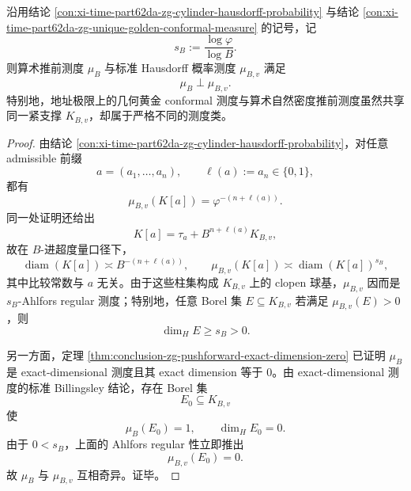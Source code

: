 \begin{theorem}\label{thm:conclusion-zg-arithmetic-golden-measure-class-splitting}
沿用结论 \ref{con:xi-time-part62da-zg-cylinder-hausdorff-probability} 与结论 \ref{con:xi-time-part62da-zg-unique-golden-conformal-measure} 的记号，记
\[
s_B:=\frac{\log\varphi}{\log B}.
\]
则算术推前测度 \(\mu_B\) 与标准 Hausdorff 概率测度 \(\mu_{B,v}\) 满足
\[
\mu_B\perp \mu_{B,v}.
\]
特别地，地址极限上的几何黄金 conformal 测度与算术自然密度推前测度虽然共享同一紧支撑 \(K_{B,v}\)，却属于严格不同的测度类。
\end{theorem}
\begin{proof}
由结论 \ref{con:xi-time-part62da-zg-cylinder-hausdorff-probability}，对任意 admissible 前缀
\[
a=(a_1,\dots,a_n),
\qquad
\ell(a):=a_n\in\{0,1\},
\]
都有
\[
\mu_{B,v}(K[a])=\varphi^{-(n+\ell(a))}.
\]
同一处证明还给出
\[
K[a]=\tau_a+B^{n+\ell(a)}K_{B,v},
\]
故在 \(B\)-进超度量口径下，
\[
\operatorname{diam}(K[a])\asymp B^{-(n+\ell(a))},
\qquad
\mu_{B,v}(K[a])\asymp \operatorname{diam}(K[a])^{s_B},
\]
其中比较常数与 \(a\) 无关。由于这些柱集构成 \(K_{B,v}\) 上的 clopen 球基，\(\mu_{B,v}\) 因而是 \(s_B\)-Ahlfors regular 测度；特别地，任意 Borel 集 \(E\subseteq K_{B,v}\) 若满足 \(\mu_{B,v}(E)>0\)，则
\[
\dim_H E\ge s_B>0.
\]

另一方面，定理 \ref{thm:conclusion-zg-pushforward-exact-dimension-zero} 已证明 \(\mu_B\) 是 exact-dimensional 测度且其 exact dimension 等于 \(0\)。由 exact-dimensional 测度的标准 Billingsley 结论，存在 Borel 集
\[
E_0\subseteq K_{B,v}
\]
使
\[
\mu_B(E_0)=1,
\qquad
\dim_H E_0=0.
\]
由于 \(0<s_B\)，上面的 Ahlfors regular 性立即推出
\[
\mu_{B,v}(E_0)=0.
\]
故 \(\mu_B\) 与 \(\mu_{B,v}\) 互相奇异。证毕。
\end{proof}


